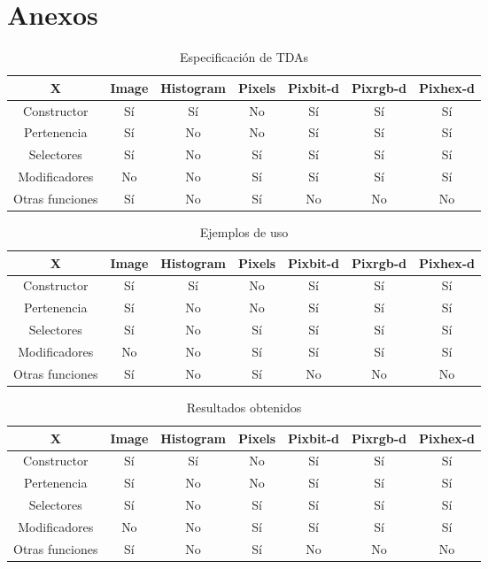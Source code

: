 \section*{Anexos}

\begin{table}[H]
    \begin{center}
    \begin{tabular}{| c | c | c | c | c | c | c | }
    \hline
    X & Image & Histogram & Pixels & Pixbit-d & Pixrgb-d & Pixhex-d \\ \hline
    Constructor & Sí & Sí & No & Sí & Sí & Sí \\
    Pertenencia & Sí & No & No & Sí & Sí & Sí \\
    Selectores & Sí & No & Sí & Sí & Sí & Sí \\
    Modificadores & No & No & Sí & Sí & Sí & Sí \\
    Otras funciones & Sí & No & Sí & No & No & No \\ \hline
    \end{tabular}
    \caption{Especificación de TDAs}
    \label{tab:TDAs}
    \end{center}
\end{table}

\begin{table}[H]
    \begin{center}
    \begin{tabular}{| c | c | c | c | c | c | c | }
    \hline
    X & Image & Histogram & Pixels & Pixbit-d & Pixrgb-d & Pixhex-d \\ \hline
    Constructor & Sí & Sí & No & Sí & Sí & Sí \\
    Pertenencia & Sí & No & No & Sí & Sí & Sí \\
    Selectores & Sí & No & Sí & Sí & Sí & Sí \\
    Modificadores & No & No & Sí & Sí & Sí & Sí \\
    Otras funciones & Sí & No & Sí & No & No & No \\ \hline
    \end{tabular}
    \caption{Ejemplos de uso}
    \label{tab:Ejemplos}
    \end{center}
\end{table}

\begin{table}[H]
    \begin{center}
    \begin{tabular}{| c | c | c | c | c | c | c | }
    \hline
    X & Image & Histogram & Pixels & Pixbit-d & Pixrgb-d & Pixhex-d \\ \hline
    Constructor & Sí & Sí & No & Sí & Sí & Sí \\
    Pertenencia & Sí & No & No & Sí & Sí & Sí \\
    Selectores & Sí & No & Sí & Sí & Sí & Sí \\
    Modificadores & No & No & Sí & Sí & Sí & Sí \\
    Otras funciones & Sí & No & Sí & No & No & No \\ \hline
    \end{tabular}
    \caption{Resultados obtenidos}
    \label{tab:Resultados}
    \end{center}
\end{table}